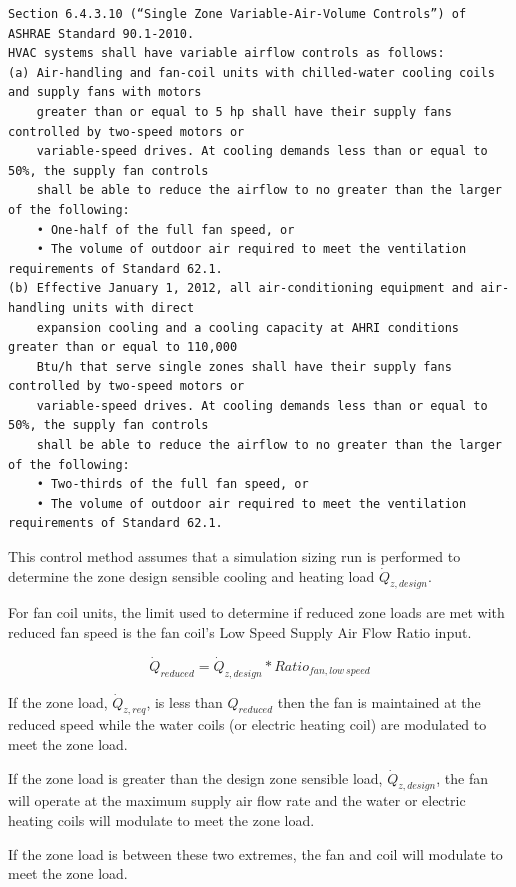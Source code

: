 \begin{lstlisting}
Section 6.4.3.10 (“Single Zone Variable-Air-Volume Controls”) of ASHRAE Standard 90.1-2010.
HVAC systems shall have variable airflow controls as follows:
(a) Air-handling and fan-coil units with chilled-water cooling coils and supply fans with motors 
    greater than or equal to 5 hp shall have their supply fans controlled by two-speed motors or
    variable-speed drives. At cooling demands less than or equal to 50%, the supply fan controls
    shall be able to reduce the airflow to no greater than the larger of the following:
    • One-half of the full fan speed, or
    • The volume of outdoor air required to meet the ventilation requirements of Standard 62.1.
(b) Effective January 1, 2012, all air-conditioning equipment and air-handling units with direct
    expansion cooling and a cooling capacity at AHRI conditions greater than or equal to 110,000
    Btu/h that serve single zones shall have their supply fans controlled by two-speed motors or
    variable-speed drives. At cooling demands less than or equal to 50%, the supply fan controls
    shall be able to reduce the airflow to no greater than the larger of the following:
    • Two-thirds of the full fan speed, or
    • The volume of outdoor air required to meet the ventilation requirements of Standard 62.1.
\end{lstlisting}

This control method assumes that a simulation sizing run is performed to determine the zone design sensible cooling and heating load \({\dot Q_{z,design}}\).

For fan coil units, the limit used to determine if reduced zone loads are met with reduced fan speed is the fan coil's Low Speed Supply Air Flow Ratio input.

\begin{equation}
{\dot Q_{reduced}} = {\dot Q_{z,design}} * {Ratio_{fan,low~speed}}
\end{equation}

If the zone load, \({\dot Q_{z,req}}\), is less than \({Q_{reduced}}\) then the fan is maintained at the reduced speed while the water coils (or electric heating coil) are modulated to meet the zone load.

If the zone load is greater than the design zone sensible load, \({\dot Q_{z,design}}\), the fan will operate at the maximum supply air flow rate and the water or electric heating coils will modulate to meet the zone load.

If the zone load is between these two extremes, the fan and coil will modulate to meet the zone load.

